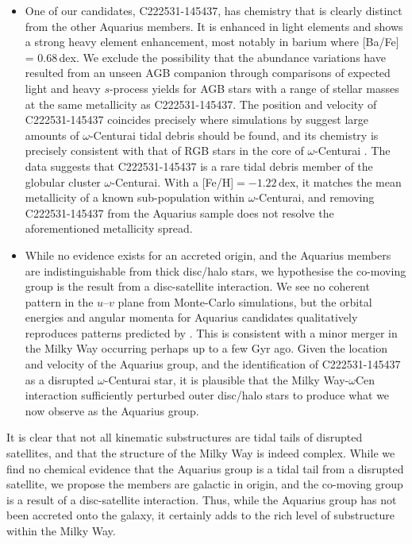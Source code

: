 \documentclass{emulateapj}
\begin{document}
\begin{itemize}
\item One of our candidates, {C222531-145437}, has chemistry that is clearly distinct from the other Aquarius members. It is enhanced in light elements and shows a strong heavy element enhancement, most notably in barium where {[Ba/Fe] = 0.68}\,dex. We exclude the possibility that the abundance variations have resulted from an unseen AGB companion through comparisons of expected light and heavy $s$-process yields for AGB stars with a range of stellar masses at the same metallicity as {C222531-145437}. The position and velocity of {C222531-145437} coincides precisely where simulations by \citet{majewski;et-al_2012} suggest large amounts of $\omega$-Centurai tidal debris should be found, and its chemistry is precisely consistent with that of RGB stars in the core of $\omega$-Centurai \citep{marino;et-al_2011}. The data suggests that {C222531-145437} is a rare tidal debris member of the globular cluster $\omega$-Centurai. With a {[Fe/H]$ = -1.22$}\,dex, it matches the mean metallicity of a known sub-population within $\omega$-Centurai, and removing C222531-145437 from the Aquarius sample does not resolve the aforementioned metallicity spread.

\item While no evidence exists for an accreted origin, and the Aquarius members are indistinguishable from thick disc/halo stars, we hypothesise the co-moving group is the result from a disc-satellite interaction. We see no coherent pattern in the $u$--$v$ plane from Monte-Carlo simulations, but the orbital energies and angular momenta for Aquarius candidates qualitatively reproduces patterns predicted by \citet{gomez;et-al_2012}. This is consistent with a minor merger in the Milky Way occurring perhaps up to a few Gyr ago. Given the location and velocity of the Aquarius group, and the identification of {C222531-145437} as a disrupted $\omega$-Centurai star, it is plausible that the Milky Way-$\omega$Cen interaction sufficiently perturbed outer disc/halo stars to produce what we now observe as the Aquarius group.
\end{itemize}

It is clear that not all kinematic substructures are tidal tails of disrupted satellites, and that the structure of the Milky Way is indeed complex. While we find no chemical evidence that the Aquarius group is a tidal tail from a disrupted satellite, we propose the members are galactic in origin, and the co-moving group is a result of a disc-satellite interaction. Thus, while the Aquarius group has not been accreted onto the galaxy, it certainly adds to the rich level of substructure within the Milky Way.
\end{document}

